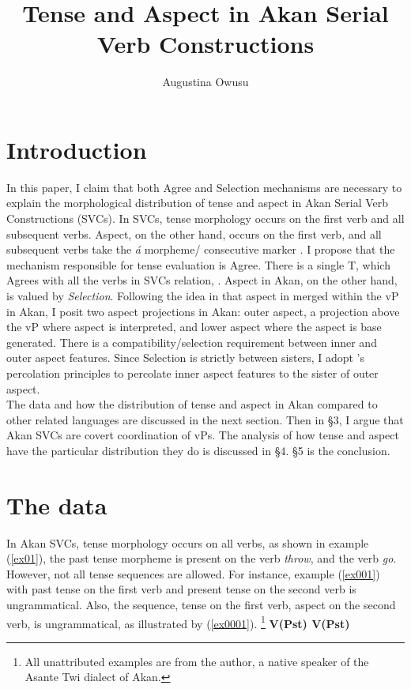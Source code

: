 \documentclass[output=paper,
modfonts
]{langscibook}
\title{Tense and Aspect in Akan Serial Verb Constructions}
\author{%
 Augustina Owusu\affiliation{Rutgers University} 
}
\begin{document}
\maketitle

\section{Introduction}

In this paper, I claim that both Agree and Selection mechanisms are necessary to explain the morphological distribution of tense and aspect in Akan Serial Verb Constructions (SVCs). In SVCs, tense morphology occurs on the first verb and all subsequent verbs. Aspect, on the other hand, occurs on the first verb, and all subsequent verbs take the \emph{\'a} morpheme/ consecutive marker \citep{Dolphyne1996, Osam2003}. I propose that the mechanism responsible for tense evaluation is Agree. There is a single T, which Agrees with all the verbs in SVCs relation, \citep{PesetskyTorrego2007}.  Aspect in Akan, on the other hand, is valued by \emph{Selection}. Following the idea in \citet{Kandybowicz2010, Kandybowicz2015} that aspect in merged within the vP in Akan, I posit two aspect projections in Akan: outer aspect, a projection above the vP where aspect is interpreted, and lower aspect where the aspect is base generated.  There is a compatibility/selection requirement between inner and outer aspect features. Since Selection is strictly between sisters, I adopt \citet{Webelhuth1992}'s percolation principles to percolate inner aspect features to the sister of outer aspect.\\
The data and how the distribution of tense and aspect in Akan compared to other related languages are discussed in the next section. Then in \S3, I argue that Akan SVCs are covert coordination of vPs. The analysis of how tense and aspect have the particular distribution they do is discussed in \S4. \S5 is the conclusion.  

\section{The data}
In Akan SVCs, tense morphology occurs on all verbs, as shown in example (\ref{ex01}), the past tense morpheme is present on the verb \emph{throw}, and the verb \emph{go}. However, not all tense sequences are allowed. For instance, example (\ref{ex001}) with past tense on the first verb and present tense on the second verb is ungrammatical. Also, the sequence, tense on the first verb, aspect on the second verb, is ungrammatical, as illustrated by (\ref{ex0001}).  
\ea \label{ex0}
\footnote{All unattributed examples are from the author, a native speaker of the Asante Twi dialect of Akan. } 
\ea \textbf{V(Pst) \phantom {} {} {} V(Pst)}
\end{document}
